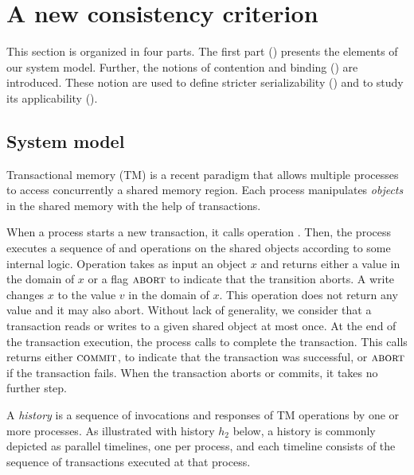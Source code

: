 \section{A new consistency criterion}

This section is organized in four parts.
The first part () presents the elements of our system model.
Further, the notions of contention and binding () are introduced.
These notion are used to define stricter serializability () and to study its applicability ().

\subsection{System model}

Transactional memory (TM) is a recent paradigm that allows multiple processes to access concurrently a shared memory region.
Each process manipulates \emph{objects} in the shared memory with the help of transactions.

When a process starts a new transaction, it calls operation \stmBeginFunction.
Then, the process executes a sequence of \stmReadFunction and \stmWriteFunction operations on the shared objects according to some internal logic.
Operation  takes as input an object $x$ and returns either a value in the domain of $x$ or a flag $\text{\textsc{abort}}$ to indicate that the transition aborts.
A write  changes $x$ to the value $v$ in the domain of $x$.
This operation does not return any value and it may also abort.
Without lack of generality, we consider that a transaction reads or writes to a given shared object at most once.
At the end of the transaction execution, the process calls \stmTryCommitFunction to complete the transaction.
This calls returns either $\text{\textsc{commit}}$, to indicate that the transaction was successful, or $\text{\textsc{abort}}$ if the transaction fails.
When the transaction aborts or commits, it takes no further step.

A \emph{history} is a sequence of invocations and responses of TM operations by one or more processes.
As illustrated with history $h_2$ below, a history is commonly depicted as parallel timelines, one per process, and each timeline consists of the sequence of transactions executed at that process.



